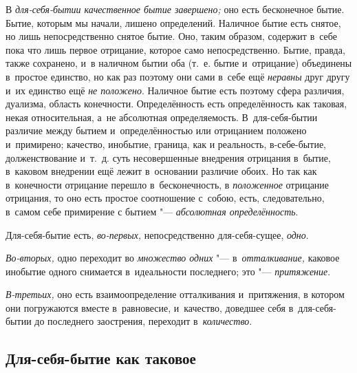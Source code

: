 В {\em для-себя-бытии качественное бытие завершено;} оно
есть бесконечное бытие. Бытие, которым мы начали, лишено определений.
Наличное бытие есть снятое, но лишь непосредственно снятое бытие. Оно,
таким образом, содержит в~себе пока что лишь первое отрицание, которое само
непосредственно. Бытие, правда, также сохранено, и~в наличном бытии оба
(т.~е. бытие и~отрицание) объединены в~простое единство, но как раз поэтому
они сами в~себе ещё {\em неравны} друг другу и~их
единство ещё {\em не положено}. Наличное бытие есть
поэтому сфера различия, дуализма, область конечности. Определённость
есть определённость как таковая, некая относительная, а~не абсолютная
определяемость. В~для-себя-бытии различие между бытием и~определённостью
или отрицанием положено и~примирено; качество, инобытие, граница, как и
реальность, в-себе-бытие, долженствование и~т.~д. суть несовершенные
внедрения отрицания в~бытие, в~каковом внедрении ещё лежит в~основании
различие обоих. Но так как в~конечности отрицание перешло в~бесконечность,
в {\em положенное} отрицание отрицания, то оно есть
простое соотношение с~собою, есть, следовательно, в~самом себе примирение с
бытием "--- {\em абсолютная определённость}.

Для-себя-бытие есть, {\em во-первых,} непосредственно
для-себя-сущее, {\em одно}.

{\em Во-вторых,} одно переходит во {\em множество одних} "---
в~{\em отталкивание,} каковое инобытие одного снимается
в~идеальности последнего; это "--- {\em притяжение}.

{\em В-третьих,} оно есть взаимоопределение отталкивания и~притяжения,
в котором они погружаются вместе в~равновесие, и~качество, доведшее себя
в~для-себя-бытии до последнего заострения, переходит в~{\em количество}.

\subsection{Для-себя-бытие как таковое}

